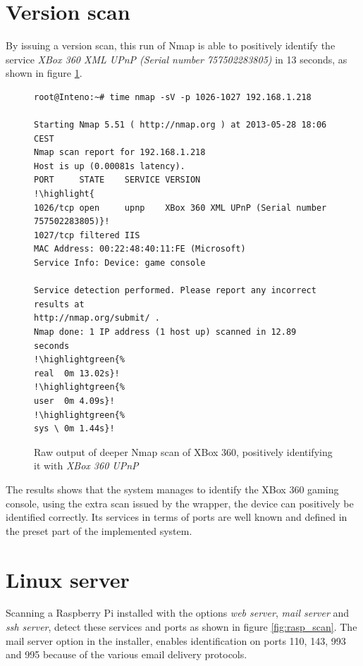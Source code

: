 \documentclass[g5paper,11pt]{kth-bcs}
\newcommand{\reducedstrut}{\vrule width 0pt height .9\ht\strutbox depth .9\dp\strutbox\relax}
\newcommand{\highlight}[1]{%
  \begingroup
  \colorbox{light-gray!20}{\footnotesize\ttfamily#1\/}%
  \endgroup
}
\newcommand{\highlightgreen}[1]{%
  \begingroup
  \colorbox{light-green!20}{#1\/}%
  \endgroup
}
\begin{document}
\newpage
\section{Version scan}
By issuing a version scan, this run of Nmap is able to positively identify the service \emph{XBox 360 XML UPnP (Serial number 757502283805)} in 13 seconds, as shown in figure \ref{fig:nmapxbox}.
   \begin{figure}[ht]
      \centering
      \begin{lstlisting}[escapechar=!]
root@Inteno:~# time nmap -sV -p 1026-1027 192.168.1.218

Starting Nmap 5.51 ( http://nmap.org ) at 2013-05-28 18:06 CEST
Nmap scan report for 192.168.1.218
Host is up (0.00081s latency).
PORT     STATE    SERVICE VERSION
!\highlight{
1026/tcp open     upnp    XBox 360 XML UPnP (Serial number 757502283805)}!
1027/tcp filtered IIS
MAC Address: 00:22:48:40:11:FE (Microsoft)
Service Info: Device: game console

Service detection performed. Please report any incorrect results at
http://nmap.org/submit/ .
Nmap done: 1 IP address (1 host up) scanned in 12.89 seconds
!\highlightgreen{%
real  0m 13.02s}!
!\highlightgreen{%
user  0m 4.09s}!
!\highlightgreen{%
sys \ 0m 1.44s}!
      \end{lstlisting}
      \caption{
	 \small{
       Raw output of deeper Nmap scan of XBox 360, positively identifying it with \emph{XBox 360 UPnP}
	 }
      }
      \label{fig:nmapxbox}
   \end{figure}

The results shows that the system manages to identify the XBox 360 gaming console, using the extra scan issued by the wrapper, the device can positively be identified correctly.
Its services in terms of ports are well known and defined in the preset part of the implemented system.

\newpage
\section{Linux server}
Scanning a Raspberry Pi installed with the options \emph{web server}, \emph{mail server} and \emph{ssh server}, detect these services and ports as shown in figure \ref{fig:rasp_scan}.
The mail server option in the installer, enables identification on ports 110, 143, 993 and 995 because of the various email delivery protocols.
\end{document}
